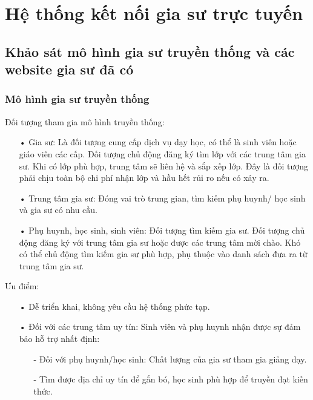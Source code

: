 \documentclass[12pt,a4paper]{report}
\begin{document}
\chapter{Hệ thống kết nối gia sư trực tuyến}
\section{Khảo sát mô hình gia sư truyền thống và các website gia sư đã có}
\subsection{Mô hình gia sư truyền thống}
Đối tượng tham gia mô hình truyền thống:
\begin{itemize}
\item[•] Gia sư:  Là đối tượng cung cấp dịch vụ dạy học, có thể là sinh viên hoặc giáo viên các cấp. Đối tượng chủ động đăng ký tìm lớp với các trung tâm gia sư. Khi có lớp phù hợp, trung tâm sẽ liên hệ và sắp xếp lớp. Đây là đối tượng phải chịu toàn bộ chi phí nhận lớp và hầu hết rủi ro nếu có xảy ra.
\item[•] Trung tâm gia sư: Đóng vai trò trung gian, tìm kiếm phụ huynh/ học sinh và gia sư có nhu cầu. 
\item[•] Phụ huynh, học sinh, sinh viên: Đối tượng tìm kiếm gia sư. Đối tượng chủ động đăng ký với trung tâm gia sư hoặc được các trung tâm mời chào. Khó có thể chủ động tìm kiếm gia sư phù hợp, phụ thuộc vào danh sách đưa ra từ trung tâm gia sư.
\end{itemize}

Ưu điểm:
\begin{itemize}
\item[•]Dễ triển khai, không yêu cầu hệ thống phức tạp.
\item[•]Đối với các trung tâm uy tín: Sinh viên và phụ huynh nhận được sự đảm bảo hỗ trợ nhất định:
\begin{itemize}
\item[-]Đối với phụ huynh/học sinh: Chất lượng của gia sư tham gia giảng dạy.
\item[-]Tìm được địa chỉ uy tín để gắn bó, học sinh phù hợp để truyền đạt
kiến thức.
\end{itemize}
\end{itemize}
\end{document}
